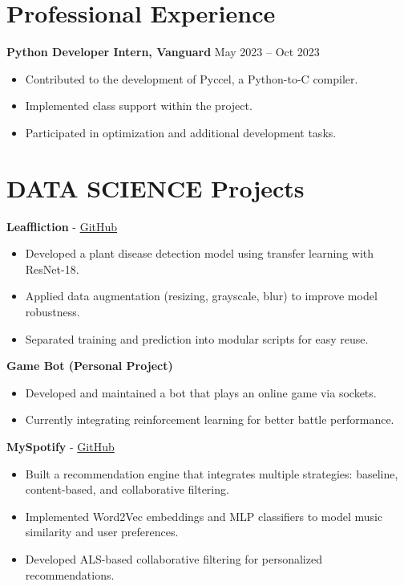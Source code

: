 \documentclass[a4paper,11pt]{article}%
\begin{document}
\section*{Professional Experience}%
\textbf{Python Developer Intern, Vanguard} \hfill May 2023 -- Oct 2023%
\begin{itemize}[leftmargin=*]%
\item Contributed to the development of Pyccel, a Python-to-C compiler.%
\item Implemented class support within the project.%
\item Participated in optimization and additional development tasks.%
\end{itemize}%
\section*{DATA SCIENCE Projects}%
%
\noindent \textbf{Leaffliction} - \href{https://github.com/sboof911/Leaffliction}{GitHub}%
\begin{itemize}[leftmargin=2em,label={},parsep=0pt,topsep=1em]%
\item Developed a plant disease detection model using transfer learning with ResNet-18.%
\item Applied data augmentation (resizing, grayscale, blur) to improve model robustness.%
\item Separated training and prediction into modular scripts for easy reuse.%
\end{itemize}%
%
\noindent \textbf{Game Bot (Personal Project)}%
\begin{itemize}[leftmargin=2em,label={},parsep=0pt,topsep=1em]%
\item Developed and maintained a bot that plays an online game via sockets.%
\item Currently integrating reinforcement learning for better battle performance.%
\end{itemize}%
%
\noindent \textbf{MySpotify} - \href{https://github.com/sboof911/MySpotify}{GitHub}%
\begin{itemize}[leftmargin=2em,label={},parsep=0pt,topsep=1em]%
\item Built a recommendation engine that integrates multiple strategies: baseline, content-based, and collaborative filtering.%
\item Implemented Word2Vec embeddings and MLP classifiers to model music similarity and user preferences.%
\item Developed ALS-based collaborative filtering for personalized recommendations.%
\end{itemize}%
\end{document}
